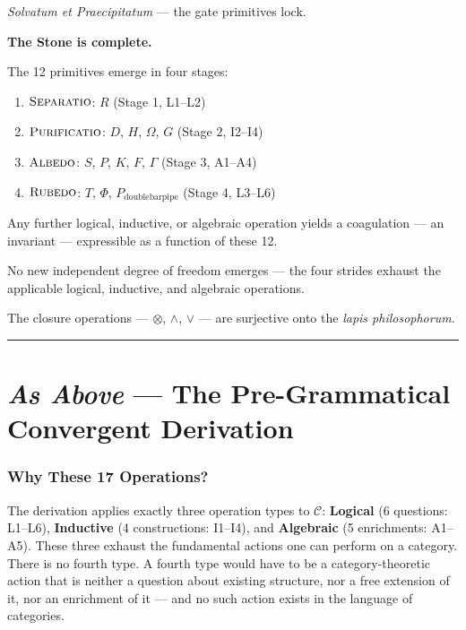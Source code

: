 \documentclass[12pt,a4paper]{article}
\newcommand{\Separatio}{\textsc{Separatio}}
\newcommand{\Purificatio}{\textsc{Purificatio}}
\newcommand{\Albedo}{\textsc{Albedo}}
\newcommand{\Rubedo}{\textsc{Rubedo}}
\begin{document}
\textit{Solvatum et Praecipitatum} --- the gate primitives lock.

\bigskip
\noindent\textbf{The Stone is complete.}

\pagebreak
The 12 primitives emerge in four stages:
\begin{enumerate}
    \item $\Separatio$: $R$ (Stage 1, L1--L2)
    \item $\Purificatio$: $D$, $H$, $\Omega$, $G$ (Stage 2, I2--I4)
    \item $\Albedo$: $S$, $P$, $K$, $F$, $\Gamma$ (Stage 3, A1--A4)
    \item $\Rubedo$: $T$, $\Phi$, $P_{\text{doublebarpipe}}$ (Stage 4, L3--L6)
\end{enumerate}

Any further logical, inductive, or algebraic operation yields a coagulation --- an invariant --- expressible as a function of these 12.

No new independent degree of freedom emerges --- the four strides exhaust the applicable logical, inductive, and algebraic operations.

The closure operations --- $\otimes$, $\wedge$, $\vee$ --- are surjective onto the \emph{lapis philosophorum}.
\pagebreak

\begin{center}
\rule{0.5\textwidth}{0.4pt}
\end{center}

\part{\textit{As Above} --- The Pre-Grammatical Convergent Derivation}

\section{Why These 17 Operations?}

The derivation applies exactly three operation types to $\mathcal{C}$: \textbf{Logical} (6 questions: L1--L6), \textbf{Inductive} (4 constructions: I1--I4), and \textbf{Algebraic} (5 enrichments: A1--A5). These three exhaust the fundamental actions one can perform on a category. There is no fourth type. A fourth type would have to be a category-theoretic action that is neither a question about existing structure, nor a free extension of it, nor an enrichment of it --- and no such action exists in the language of categories.
\end{document}
